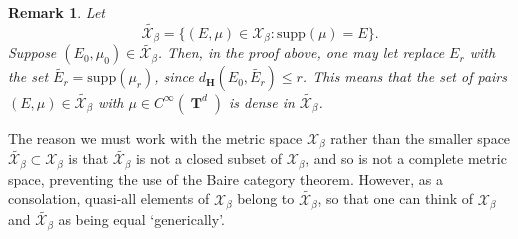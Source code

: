 \documentclass[dvipsnames,letterpaper,12pt]{article}
\numberwithin{equation}{section}
\DeclareMathOperator{\TT}{\mathbf{T}}
\newtheorem{remark}[theorem]{Remark}
\numberwithin{theorem}{section}
\begin{document}
\begin{remark} \label{remarkDOIWJDIOWJ2}
    Let
    \[ \tilde{\mathcal{X}_\beta} = \{ (E,\mu) \in \mathcal{X}_\beta : \text{supp}(\mu) = E \}. \]
    Suppose $(E_0,\mu_0) \in \tilde{\mathcal{X}_\beta}$. Then, in the proof above, one may let replace $E_r$ with the set $\tilde{E_r} = \text{supp}(\mu_r)$, since $d_{\mathbf{H}}(E_0,\tilde{E_r}) \leq r$. This means that the set of pairs $(E,\mu) \in \tilde{\mathcal{X}_\beta}$ with $\mu \in C^\infty(\TT^d)$ is dense in $\tilde{\mathcal{X}_\beta}$.
\end{remark}

The reason we must work with the metric space $\mathcal{X}_\beta$ rather than the smaller space $\tilde{\mathcal{X}_\beta} \subset \mathcal{X}_\beta$ is that $\tilde{\mathcal{X}_\beta}$ is not a closed subset of $\mathcal{X}_\beta$, and so is not a complete metric space, preventing the use of the Baire category theorem. However, as a consolation, quasi-all elements of $\mathcal{X}_\beta$ belong to $\tilde{\mathcal{X}_\beta}$, so that one can think of $\mathcal{X}_\beta$ and $\tilde{\mathcal{X}_\beta}$ as being equal `generically'.
\end{document}
